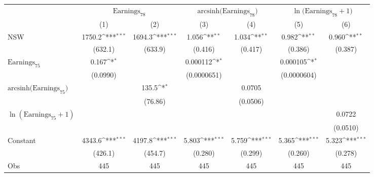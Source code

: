 {
\def\sym#1{\ifmmode^{#1}\else\(^{#1}\)\fi}
\begin{tabular}{l*{6}{c}}
\hline\hline
                &\multicolumn{2}{c}{$\text{Earnings}_{78}$}&\multicolumn{2}{c}{$\text{arcsinh(Earnings}_{78}\text{)}$}&\multicolumn{2}{c}{$\ln\text{(Earnings}_{78}+1\text{)}$}\\\cmidrule(lr){2-3}\cmidrule(lr){4-5}\cmidrule(lr){6-7}
                &\multicolumn{1}{c}{(1)}         &\multicolumn{1}{c}{(2)}         &\multicolumn{1}{c}{(3)}         &\multicolumn{1}{c}{(4)}         &\multicolumn{1}{c}{(5)}         &\multicolumn{1}{c}{(6)}         \\
\hline
NSW             &   1750.2\sym{***}&   1694.3\sym{***}&    1.056\sym{**} &    1.034\sym{**} &    0.982\sym{**} &    0.960\sym{**} \\
                &  (632.1)         &  (633.9)         &  (0.416)         &  (0.417)         &  (0.386)         &  (0.387)         \\
$\text{Earnings}_{75}$&    0.167\sym{*}  &                  & 0.000112\sym{*}  &                  & 0.000105\sym{*}  &                  \\
                & (0.0990)         &                  &(0.0000651)         &                  &(0.0000604)         &                  \\
$\text{arcsinh(Earnings}_{75}\text{)}$&                  &    135.5\sym{*}  &                  &   0.0705         &                  &                  \\
                &                  &  (76.86)         &                  & (0.0506)         &                  &                  \\
$\ln(\text{Earnings}_{75}+1)$&                  &                  &                  &                  &                  &   0.0722         \\
                &                  &                  &                  &                  &                  & (0.0510)         \\
Constant        &   4343.6\sym{***}&   4197.8\sym{***}&    5.803\sym{***}&    5.759\sym{***}&    5.365\sym{***}&    5.323\sym{***}\\
                &  (426.1)         &  (454.7)         &  (0.280)         &  (0.299)         &  (0.260)         &  (0.278)         \\
\hline
Obs             &      445         &      445         &      445         &      445         &      445         &      445         \\

\end{tabular}}
